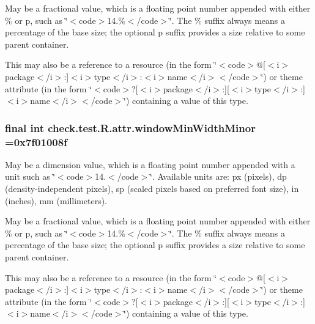 May be a fractional value, which is a floating point number appended with either \% or p, such as \char`\"{}$<$code$>$14.\%$<$/code$>$\char`\"{}. The \% suffix always means a percentage of the base size; the optional p suffix provides a size relative to some parent container. 

This may also be a reference to a resource (in the form \char`\"{}$<$code$>$@\mbox{[}$<$i$>$package$<$/i$>$\+:\mbox{]}$<$i$>$type$<$/i$>$\+:$<$i$>$name$<$/i$>$$<$/code$>$\char`\"{}) or theme attribute (in the form \char`\"{}$<$code$>$?\mbox{[}$<$i$>$package$<$/i$>$\+:\mbox{]}\mbox{[}$<$i$>$type$<$/i$>$\+:\mbox{]}$<$i$>$name$<$/i$>$$<$/code$>$\char`\"{}) containing a value of this type. \hypertarget{classcheck_1_1test_1_1_r_1_1attr_acc028cfe18328eb830afb880f3d7b3ad}{}
\subsubsection[{window\+Min\+Width\+Minor}]{\setlength{\rightskip}{0pt plus 5cm}final int check.\+test.\+R.\+attr.\+window\+Min\+Width\+Minor =0x7f01008f\hspace{0.3cm}{\ttfamily [static]}}\label{classcheck_1_1test_1_1_r_1_1attr_acc028cfe18328eb830afb880f3d7b3ad}
May be a dimension value, which is a floating point number appended with a unit such as \char`\"{}$<$code$>$14.\+5sp$<$/code$>$\char`\"{}. Available units are\+: px (pixels), dp (density-\/independent pixels), sp (scaled pixels based on preferred font size), in (inches), mm (millimeters). 

May be a fractional value, which is a floating point number appended with either \% or p, such as \char`\"{}$<$code$>$14.\%$<$/code$>$\char`\"{}. The \% suffix always means a percentage of the base size; the optional p suffix provides a size relative to some parent container. 

This may also be a reference to a resource (in the form \char`\"{}$<$code$>$@\mbox{[}$<$i$>$package$<$/i$>$\+:\mbox{]}$<$i$>$type$<$/i$>$\+:$<$i$>$name$<$/i$>$$<$/code$>$\char`\"{}) or theme attribute (in the form \char`\"{}$<$code$>$?\mbox{[}$<$i$>$package$<$/i$>$\+:\mbox{]}\mbox{[}$<$i$>$type$<$/i$>$\+:\mbox{]}$<$i$>$name$<$/i$>$$<$/code$>$\char`\"{}) containing a value of this type. \hypertarget{classcheck_1_1test_1_1_r_1_1attr_a29fbabdf31581c8b92ca157f7379b0c4}{}
